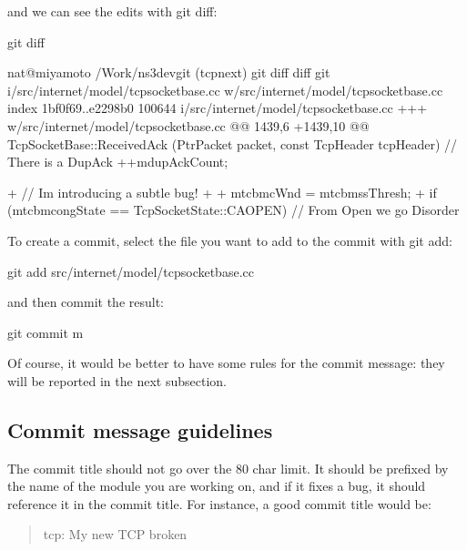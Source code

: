 \documentclass[letterpaper,10pt,english]{sphinxmanual}
\begin{document}
and we can see the edits with git diff:

\begin{sphinxVerbatim}[commandchars=\\\{\}]
\PYGZdl{} git diff

nat@miyamoto \PYGZti{}/Work/ns\PYGZhy{}3\PYGZhy{}dev\PYGZhy{}git (tcp\PYGZhy{}next)\PYGZdl{} git diff
diff \PYGZhy{}\PYGZhy{}git i/src/internet/model/tcp\PYGZhy{}socket\PYGZhy{}base.cc w/src/internet/model/tcp\PYGZhy{}socket\PYGZhy{}base.cc
index 1bf0f69..e2298b0 100644
\PYGZhy{}\PYGZhy{}\PYGZhy{} i/src/internet/model/tcp\PYGZhy{}socket\PYGZhy{}base.cc
+++ w/src/internet/model/tcp\PYGZhy{}socket\PYGZhy{}base.cc
@@ \PYGZhy{}1439,6 +1439,10 @@ TcpSocketBase::ReceivedAck (Ptr\PYGZlt{}Packet\PYGZgt{} packet, const TcpHeader\PYGZam{} tcpHeader)
       // There is a DupAck
       ++m\PYGZus{}dupAckCount;

+      // I\PYGZsq{}m introducing a subtle bug!
+
+      m\PYGZus{}tcb\PYGZhy{}\PYGZgt{}m\PYGZus{}cWnd = m\PYGZus{}tcb\PYGZhy{}\PYGZgt{}m\PYGZus{}ssThresh;
+
       if (m\PYGZus{}tcb\PYGZhy{}\PYGZgt{}m\PYGZus{}congState == TcpSocketState::CA\PYGZus{}OPEN)
         \PYGZob{}
           // From Open we go Disorder
\end{sphinxVerbatim}

To create a commit, select the file you want to add to the commit with git add:

\begin{sphinxVerbatim}[commandchars=\\\{\}]
\PYGZdl{} git add src/internet/model/tcp\PYGZhy{}socket\PYGZhy{}base.cc
\end{sphinxVerbatim}

and then commit the result:

\begin{sphinxVerbatim}[commandchars=\\\{\}]
\PYGZdl{} git commit \PYGZhy{}m 
\end{sphinxVerbatim}

Of course, it would be better to have some rules for the commit message: they will be reported in the next subsection.


\subsection{Commit message guidelines}
\label{\detokenize{working-with-git:commit-message-guidelines}}
The commit title should not go over the 80 char limit. It should be prefixed by the name of the module you are working on, and if it fixes a bug, it should reference it in the commit title. For instance, a good commit title would be:
\begin{quote}

tcp: My new TCP broken
\end{quote}
\end{document}
